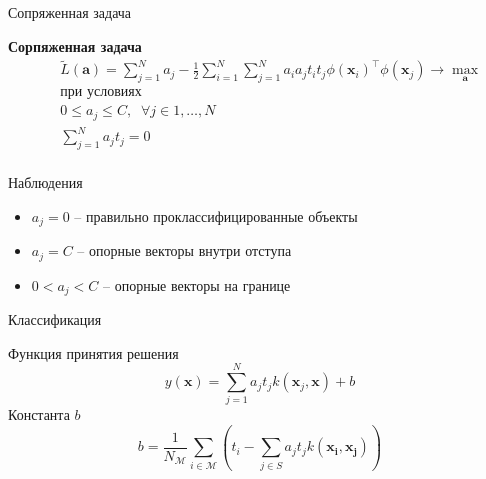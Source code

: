 \documentclass[10pt]{beamer}
\begin{document}
\begin{frame}{Сопряженная задача}

\begin{framed}
{\bf Сорпяженная задача}
\begin{eqnarray*}
&& \tilde{L}(\mathbf{a}) = \sum_{j=1}^N a_j - \frac{1}{2} \sum_{i=1}^N \sum_{j=1}^N a_i a_j t_i t_j \phi(\mathbf{x}_i)^\top \phi(\mathbf{x}_j) \rightarrow \max_{\mathbf{a}} \\
&& \text{при условиях} \\
&& 0 \leq a_j \leq C, \;\; \forall j \in 1,\ldots,N \\
&& \sum_{j=1}^N a_j t_j = 0\\
\end{eqnarray*}
\end{framed}

Наблюдения
\begin{itemize}
\item $a_j = 0$ -- правильно проклассифицированные объекты
\item $a_j = C$ -- опорные векторы внутри отступа 
\item $0 < a_j < C$ -- опорные векторы на границе
\end{itemize}

\end{frame}

\begin{frame}{Классификация}

Функция принятия решения
\[
y(\mathbf{x}) = \sum_{j=1}^N a_j t_j k(\mathbf{x}_j, \mathbf{x}) + b
\]
Константа $b$
\[
b = \frac{1}{N_\mathcal{M}} \sum_{i \in \mathcal{M}} \left( t_i - \sum_{j \in S} a_j t_j k(\mathbf{x_i}, \mathbf{x_j})\right)
\]

\end{frame}
\end{document}
